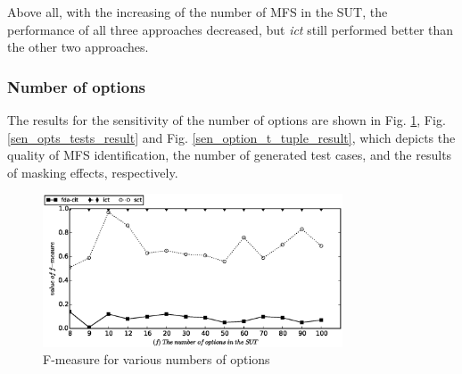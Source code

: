 \documentclass[journal,12pt,onecolumn,draftclsnofoot,]{IEEEtran}
\begin{document}


Above all, with the increasing of the number of MFS in the SUT, the performance of all three approaches decreased, but \emph{ict} still performed better than the other two approaches.


\subsubsection{Number of options}
The results for the sensitivity of the number of options are shown in Fig. \ref{sen_opts_f_measure_result}, Fig. \ref{sen_opts_tests_result} and Fig. \ref{sen_option_t_tuple_result}, which depicts the quality of MFS identification, the number of generated test cases, and the results of masking effects, respectively.

\begin{figure}[htbp]
 \includegraphics[width=3.5in]{sens_options_f_measure.eps}
\caption{F-measure for various numbers of options}
\label{sen_opts_f_measure_result}
\end{figure}
\end{document}
